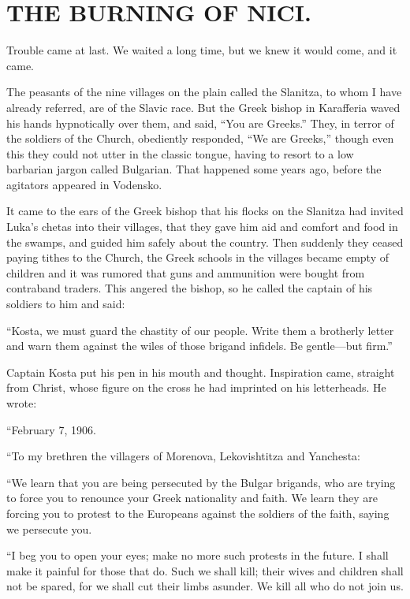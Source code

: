\documentclass[a5paper,12pt]{book}
\begin{document}

\chapter{THE BURNING OF NICI.}

Trouble came at last. We waited a long time, but we knew it would come, and it came. 

The peasants of the nine villages on the plain called the Slanitza, to whom I have already referred, are of the Slavic race. But the Greek bishop in Karafferia waved his hands hypnotically over them, and said, “You are Greeks.” They, in terror of the soldiers of the Church, obediently responded, “We are Greeks,” though even this they could not utter in the classic tongue, having to resort to a low barbarian jargon called Bulgarian. That happened some years ago, before the agitators appeared in Vodensko. 

It came to the ears of the Greek bishop that his flocks on the Slanitza had invited Luka’s chetas into their villages, that they gave him aid and comfort and food in the swamps, and guided him safely about the country. Then suddenly they ceased paying tithes to the Church, the Greek schools in the villages became empty of children and it was rumored that guns and ammunition were bought from contraband traders. This angered the bishop, so he called the captain of his soldiers to him and said: 

“Kosta, we must guard the chastity of our people. Write them a brotherly letter and warn them against the wiles of those brigand infidels. Be gentle—but firm.” 

Captain Kosta put his pen in his mouth and thought. Inspiration came, straight from Christ, whose figure on the cross he had imprinted on his letterheads. He wrote: 

“February 7, 1906. 

“To my brethren the villagers of Morenova, Lekovishtitza and Yanchesta: 

“We learn that you are being persecuted by the Bulgar brigands, who are trying to force you to renounce your Greek nationality and faith. We learn they are forcing you to protest to the Europeans against the soldiers of the faith, saying we persecute you. 

“I beg you to open your eyes; make no more such protests in the future. I shall make it painful for those that do. Such we shall kill; their wives and children shall not be spared, for we shall cut their limbs asunder. We kill all who do not join us. 
\end{document}
